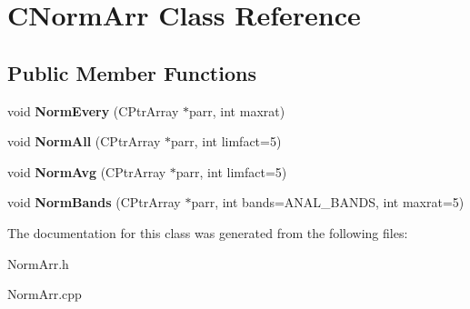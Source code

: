 \hypertarget{class_c_norm_arr}{\section{C\-Norm\-Arr Class Reference}
\label{class_c_norm_arr}
}
\subsection*{Public Member Functions}
\begin{DoxyCompactItemize}
\item 
\hypertarget{class_c_norm_arr_a5fe39c77b233f74194924482edf9c3ee}{void {\bfseries Norm\-Every} (C\-Ptr\-Array $\ast$parr, int maxrat)}\label{class_c_norm_arr_a5fe39c77b233f74194924482edf9c3ee}

\item 
\hypertarget{class_c_norm_arr_a280df115dba7fc0f3074100ffdda7746}{void {\bfseries Norm\-All} (C\-Ptr\-Array $\ast$parr, int limfact=5)}\label{class_c_norm_arr_a280df115dba7fc0f3074100ffdda7746}

\item 
\hypertarget{class_c_norm_arr_ab7f51f7748b2c325f1f72a7e321cfd95}{void {\bfseries Norm\-Avg} (C\-Ptr\-Array $\ast$parr, int limfact=5)}\label{class_c_norm_arr_ab7f51f7748b2c325f1f72a7e321cfd95}

\item 
\hypertarget{class_c_norm_arr_a29c9a06b9f8f4a5395bcc50ab2c1dea9}{void {\bfseries Norm\-Bands} (C\-Ptr\-Array $\ast$parr, int bands=A\-N\-A\-L\-\_\-\-B\-A\-N\-D\-S, int maxrat=5)}\label{class_c_norm_arr_a29c9a06b9f8f4a5395bcc50ab2c1dea9}

\end{DoxyCompactItemize}


The documentation for this class was generated from the following files\-:\begin{DoxyCompactItemize}
\item 
Norm\-Arr.\-h\item 
Norm\-Arr.\-cpp\end{DoxyCompactItemize}
